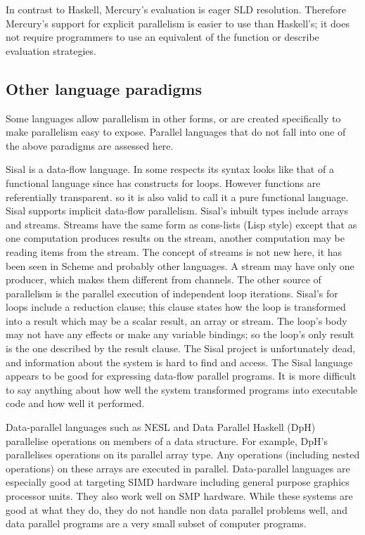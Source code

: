 In contrast to Haskell,
Mercury's evaluation is eager SLD resolution.
Therefore Mercury's support for explicit parallelism is easier to use
than Haskell's;
it does not require programmers to use an equivalent of
the  function or describe evaluation strategies.



\subsection{Other language paradigms}
\label{sec:intro_par_other}

Some languages allow parallelism in other forms,
or are created specifically to make parallelism easy to expose.
Parallel languages that do not fall into one of the above paradigms are
assessed here.

Sisal \citep{feo:1990:sisal-report} is a data-flow language.
In some respects its syntax looks like that of a functional language
since has constructs for loops.
However functions are referentially transparent.
so it is also valid to call it a pure functional language.
Sisal supports implicit data-flow parallelism.
Sisal's inbuilt types include arrays and streams.
Streams have the same form as cons-lists (Lisp style) except that as one
computation produces results on the stream, another computation may be
reading items from the stream.
The concept of streams is not new here,
it has been seen in Scheme \citep{wizard-book} and probably other
languages.
A stream may have only one producer,
which makes them different from channels.
The other source of parallelism is the parallel execution of independent
loop iterations.
Sisal's for loops include a reduction clause;
this clause states how the loop is transformed into a result which may be a
scalar result, an array or stream.
The loop's body may not have any effects or make any variable bindings;
so the loop's only result is the one described by the result clause.
The Sisal project is unfortunately dead,
and information about the system is hard to find and access.
The Sisal language appears to be good for expressing data-flow
parallel programs.
It is more difficult to say anything about how well the system
transformed programs into executable code and how well it performed.

Data-parallel languages such as
NESL \citep{blelloch:95:nesl} and
Data Parallel Haskell (DpH)
\citep{dph:2007:status_report,dph:2008:harnessing_the_multicores}
parallelise operations on members of a data structure.
For example,
DpH's parallelises operations on its parallel array type.
Any operations (including nested operations) on these arrays are
executed in parallel.
Data-parallel languages are especially good at targeting SIMD hardware
including general purpose graphics processor units.
They also work well on SMP hardware.
While these systems are good at what they do,
they do not handle non data parallel problems well,
and data parallel programs are a very small subset of computer programs.

